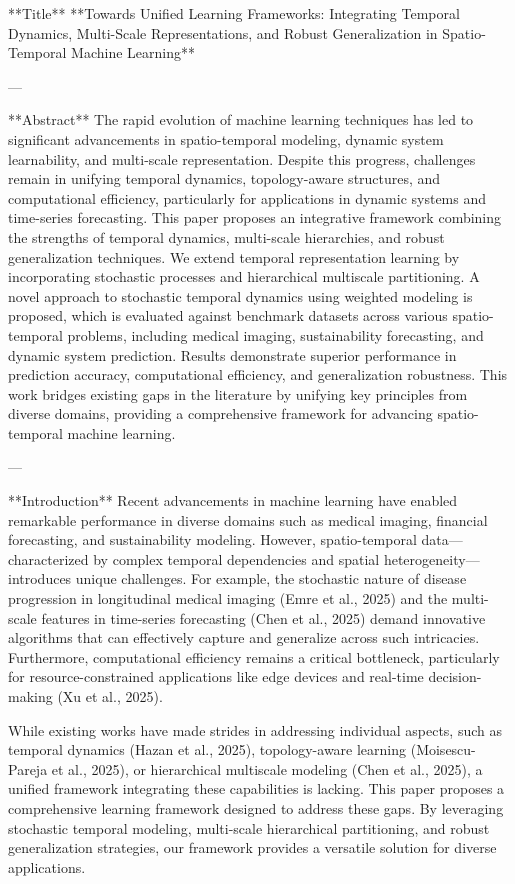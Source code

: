 **Title**  
**Towards Unified Learning Frameworks: Integrating Temporal Dynamics, Multi-Scale Representations, and Robust Generalization in Spatio-Temporal Machine Learning**

---

**Abstract**  
The rapid evolution of machine learning techniques has led to significant advancements in spatio-temporal modeling, dynamic system learnability, and multi-scale representation. Despite this progress, challenges remain in unifying temporal dynamics, topology-aware structures, and computational efficiency, particularly for applications in dynamic systems and time-series forecasting. This paper proposes an integrative framework combining the strengths of temporal dynamics, multi-scale hierarchies, and robust generalization techniques. We extend temporal representation learning by incorporating stochastic processes and hierarchical multiscale partitioning. A novel approach to stochastic temporal dynamics using weighted modeling is proposed, which is evaluated against benchmark datasets across various spatio-temporal problems, including medical imaging, sustainability forecasting, and dynamic system prediction. Results demonstrate superior performance in prediction accuracy, computational efficiency, and generalization robustness. This work bridges existing gaps in the literature by unifying key principles from diverse domains, providing a comprehensive framework for advancing spatio-temporal machine learning.

---

**Introduction**  
Recent advancements in machine learning have enabled remarkable performance in diverse domains such as medical imaging, financial forecasting, and sustainability modeling. However, spatio-temporal data—characterized by complex temporal dependencies and spatial heterogeneity—introduces unique challenges. For example, the stochastic nature of disease progression in longitudinal medical imaging (Emre et al., 2025) and the multi-scale features in time-series forecasting (Chen et al., 2025) demand innovative algorithms that can effectively capture and generalize across such intricacies. Furthermore, computational efficiency remains a critical bottleneck, particularly for resource-constrained applications like edge devices and real-time decision-making (Xu et al., 2025).

While existing works have made strides in addressing individual aspects, such as temporal dynamics (Hazan et al., 2025), topology-aware learning (Moisescu-Pareja et al., 2025), or hierarchical multiscale modeling (Chen et al., 2025), a unified framework integrating these capabilities is lacking. This paper proposes a comprehensive learning framework designed to address these gaps. By leveraging stochastic temporal modeling, multi-scale hierarchical partitioning, and robust generalization strategies, our framework provides a versatile solution for diverse applications.

